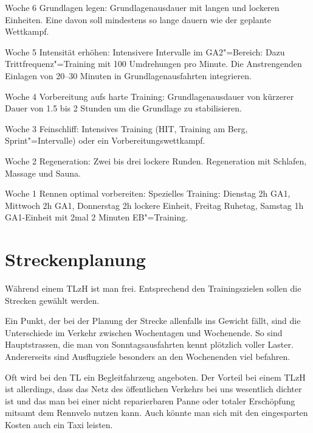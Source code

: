 \documentclass[a4paper,DIV13,BCOR0cm,draft=TRUE]{scrartcl}
\newcommand{\rv}{Rennvelo}
\newcommand{\tlzh}{TLzH}
\begin{document}
\begin{itemize*}
        \item Woche 6 Grundlagen legen:
                Grundlagenausdauer mit langen und lockeren Einheiten.
                Eine davon soll mindestens so lange dauern wie der geplante Wettkampf.
        \item Woche 5 Intensität erhöhen:
                Intensivere Intervalle im GA2"=Bereich:
                Dazu Trittfrequenz"=Training mit 100 Umdrehungen pro Minute.
                Die Anstrengenden Einlagen von 20--30 Minuten in Grundlagenausfahrten integrieren.
        \item Woche 4 Vorbereitung aufs harte Training:
                Grundlagenausdauer von kürzerer Dauer von 1.5 bis 2 Stunden
                um die Grundlage zu stabilisieren.
        \item Woche 3 Feinschliff:
                Intensives Training (HIT, Training am Berg, Sprint"=Intervalle) oder ein Vorbereitungswettkampf.
        \item Woche 2 Regeneration:
                Zwei bis drei lockere Runden. Regeneration mit Schlafen, Massage und Sauna.
        \item Woche 1 Rennen optimal vorbereiten:
                Spezielles Training: Dienstag 2h GA1, Mittwoch 2h GA1, Donnerstag 2h lockere Einheit, Freitag Ruhetag, 
                Samstag 1h GA1-Einheit mit 2mal 2 Minuten EB"=Training.

\end{itemize*}


\section{Streckenplanung}

Während einem \tlzh{} ist man frei. Entsprechend den Trainingszielen sollen die Strecken gewählt werden.

Ein Punkt, der bei der Planung der Strecke allenfalls ins Gewicht fällt,
sind die Unterschiede im Verkehr zwischen Wochentagen und Wochenende.
So sind Hauptstrassen, die man von Sonntagsausfahrten kennt plötzlich voller Laster.
Andererseits sind Ausflugziele besonders an den Wochenenden viel befahren.

Oft wird bei den TL ein Begleitfahrzeug angeboten.
Der Vorteil bei einem \tlzh{} ist allerdings, dass das Netz des öffentlichen Verkehrs bei uns
wesentlich dichter ist und das man bei einer nicht reparierbaren Panne oder totaler Erschöpfung
mitsamt dem \rv{} nutzen kann. Auch könnte man sich mit den eingesparten Kosten auch ein Taxi leisten.
\end{document}
